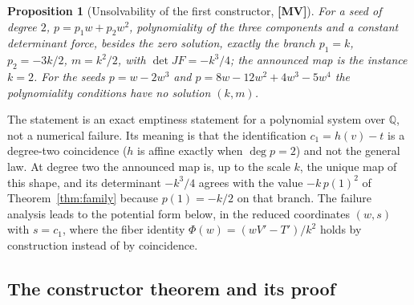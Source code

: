 \documentclass[11pt]{article}
\newtheorem{proposition}[theorem]{Proposition}
\theoremstyle{definition}
\theoremstyle{remark}
\newcommand{\Q}{\mathbb{Q}}
\newcommand{\MV}{\textbf{[MV]}}
\begin{document}
\begin{proposition}[Unsolvability of the first constructor, {\MV}]\label{prop:first}
For a seed of degree $2$, $p = p_1 w + p_2 w^2$, polynomiality of the three components and a constant determinant force, besides the zero solution, exactly the branch $p_1 = k$, $p_2 = -3k/2$, $m = k^2/2$, with $\det JF = -k^3/4$; the announced map is the instance $k = 2$. For the seeds $p = w - 2w^3$ and $p = 8w - 12w^2 + 4w^3 - 5w^4$ the polynomiality conditions have no solution $(k, m)$.
\end{proposition}

The statement is an exact emptiness statement for a polynomial system over $\Q$, not a numerical failure. Its meaning is that the identification $c_1 = h(v) - t$ is a degree-two coincidence ($h$ is affine exactly when $\deg p = 2$) and not the general law. At degree two the announced map is, up to the scale $k$, the unique map of this shape, and its determinant $-k^3/4$ agrees with the value $-k\,p(1)^2$ of Theorem~\ref{thm:family} because $p(1) = -k/2$ on that branch. The failure analysis leads to the potential form below, in the reduced coordinates $(w, s)$ with $s = c_1$, where the fiber identity $\Phi(w) = (wV' - T')/k^2$ holds by construction instead of by coincidence.

\subsection{The constructor theorem and its proof}\label{sec:constructor}
\end{document}
